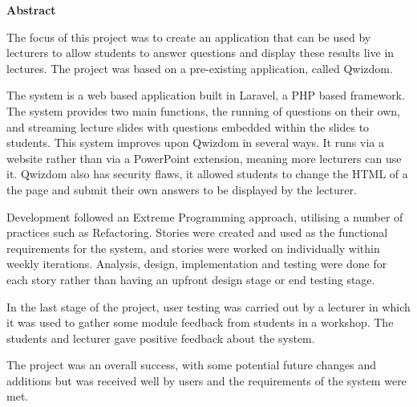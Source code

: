 \thispagestyle{empty}

\begin{center}
    {\LARGE\bf Abstract}
\end{center}

The focus of this project was to create an application that can be used by lecturers to allow students to answer questions and display these results live in lectures. The project was based on a pre-existing application, called Qwizdom.

The system is a web based application built in Laravel, a PHP based framework. The system provides two main functions, the running of questions on their own, and streaming lecture slides with questions embedded within the slides to students. This system improves upon Qwizdom in several ways. It runs via a website rather than via a PowerPoint extension, meaning more lecturers can use it. Qwizdom also has security flaws, it allowed students to change the HTML of a the page and submit their own answers to be displayed by the lecturer.

Development followed an Extreme Programming approach, utilising a number of practices such as Refactoring. Stories were created and used as the functional requirements for the system, and stories were worked on individually within weekly iterations. Analysis, design, implementation and testing were done for each story rather than having an upfront design stage or end testing stage.

In the last stage of the project, user testing was carried out by a lecturer in which it was used to gather some module feedback from students in a workshop. The students and lecturer gave positive feedback about the system.

The project was an overall success, with some potential future changes and additions but was received well by users and the requirements of the system were met.
